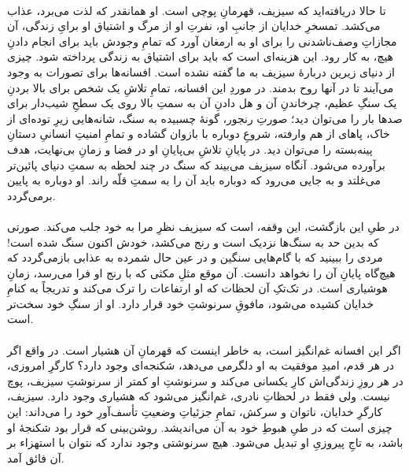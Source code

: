 \documentclass[12pt]{book}
\begin{document}
    \paragraph{}
    تا حالا دریافته‌اید که سیزیف، قهرمانِ پوچی است. او همانقدر که لذت می‌برد، عذاب می‌کشد. تمسخرِ خدایان از جانبِ او، نفرتِ او از مرگ و اشتیاق او برایِ زندگی، آن مجازاتِ وصف‌ناشدنی را برای او به ارمغان آورد که تمامِ وجودش باید برای انجام دادنِ هیچ، به کار رود. این هزینه‌ای است که باید برای اشتیاق به زندگی پرداخته شود. چیزی از دنیای زیرین دربارهٔ سیزیف به ما گفته نشده است. افسانه‌ها برای تصورات به وجود می‌آیند تا در آنها روح بدمند. در موردِ این افسانه، تمامِ تلاشِ یک شخص برای بالا بردنِ یک سنگِ عظیم، چرخاندنِ آن و هل دادنِ آن به سمتِ بالا روی یک سطحِ شیب‌دار برای صدها بار را می‌توان دید؛ صورتِ رنجور، گونهٔ چسبیده به سنگ، شانه‌هایی زیرِ توده‌ای از خاک، پاهای از هم وارفته، شروعِ دوباره با بازوان گشاده و تمامِ امنیتِ انسانیِ دستانِ پینه‌بسته را می‌توان دید. در پایانِ تلاشِ بی‌پایانِ او در فضا و زمانِ بی‌نهایت، هدف برآورده می‌شود. آنگاه سیزیف می‌بیند که سنگ در چند لحظه به سمتِ دنیای پائین‌تر می‌غلتد و به جایی می‌رود که دوباره باید آن را به سمتِ قلّه راند. او دوباره به پایین برمی‌گردد.
    
    \paragraph{}
    در طیِ این بازگشت، این وقفه، است که سیزیف نظرِ مرا به خود جلب می‌کند. صورتی که بدین حد به سنگ‌ها نزدیک است و رنج می‌کشد، خودش اکنون سنگ شده است! مردی را ببینید که با گام‌هایی سنگین و در عین حال شمرده به عذابی بازمی‌گردد که هیچ‌گاه پایانِ آن را نخواهد دانست. آن موقع مثلِ مکثی که با رنج او فرا می‌رسد، زمانِ هوشیاری است. در تک‌تکِ آن لحظات که او ارتفاعات را ترک می‌کند و تدریجاً به کنامِ خدایان کشیده می‌شود، مافوقِ سرنوشتِ خود قرار دارد. او از سنگِ خود سخت‌تر است.
    
    \paragraph{}
    اگر این افسانه غم‌انگیز است، به خاطر اینست که قهرمانِ آن هشیار است. در واقع اگر در هر قدم، امیدِ موفقیت به او دلگرمی می‌دهد، شکنجه‌ای وجود دارد؟ کارگرِ امروزی، در هر روزِ زندگی‌اش کارِ یکسانی می‌کند و سرنوشتِ او کمتر از سرنوشتِ سیزیف، پوچ نیست. ولی فقط در لحظاتِ نادری، غم‌انگیز می‌شود که هشیاری وجود دارد. سیزیف، کارگرِ خدایان، ناتوان و سرکش، تمامِ جزئیاتِ وضعیتِ تأسف‌آورِ خود را می‌داند: این چیزی است که در طیِ هبوطِ خود به آن می‌اندیشد. روشن‌بینی که قرار بود شکنجهٔ او باشد، به تاجِ پیروزیِ او تبدیل می‌شود. هیچ سرنوشتی وجود ندارد که نتوان با استهزاء بر آن فائق آمد.
    
\end{document}
